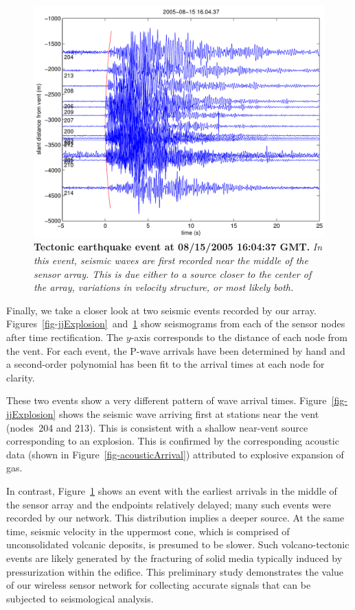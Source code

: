 \begin{figure}[t]
\begin{center}
\includegraphics[width=\hsize]{./casestudy/figs/fidelity/seismicArrival/johnson/2005-08-15_16-04-37.pdf}
\end{center}
\caption{\small{\bf Tectonic earthquake event at 08/15/2005 16:04:37
GMT.} {\em In this event, seismic waves are first recorded near the
middle of the sensor array. This is due either to a source closer 
to the center of the array, variations in velocity structure, 
or most likely both.}}
\label{fig-jjTectonic}
\end{figure}

Finally, we take a closer look at two seismic events recorded by our
array.  Figures~\ref{fig-jjExplosion}~and~\ref{fig-jjTectonic} show
seismograms from each of the sensor nodes after time rectification.
The $y$-axis corresponds to the distance of each node from the vent.
For each event, the P-wave arrivals have been determined by hand and a
second-order polynomial has been fit to the arrival times at each node
for clarity.

These two events show a very different pattern of wave arrival
times. Figure~\ref{fig-jjExplosion} shows the seismic wave
arriving first at stations near the vent (nodes~204 and 213). This
is consistent with a shallow near-vent source corresponding to an
explosion. This is confirmed by the corresponding acoustic data (shown
in Figure~\ref{fig-acousticArrival}) attributed to explosive expansion
of gas. 

In contrast, Figure~\ref{fig-jjTectonic} shows an event with the earliest
arrivals in the middle of the sensor array and the endpoints relatively
delayed; many such events were recorded by our network. 
This distribution implies a deeper source.  At the same time,
seismic velocity in the uppermost cone, which is comprised of unconsolidated
volcanic deposits, is presumed to be slower.  Such volcano-tectonic events
are likely generated by the fracturing of solid media typically induced
by pressurization within the edifice. This preliminary study
demonstrates the value of our wireless sensor network for collecting
accurate signals that can be subjected to seismological analysis.

